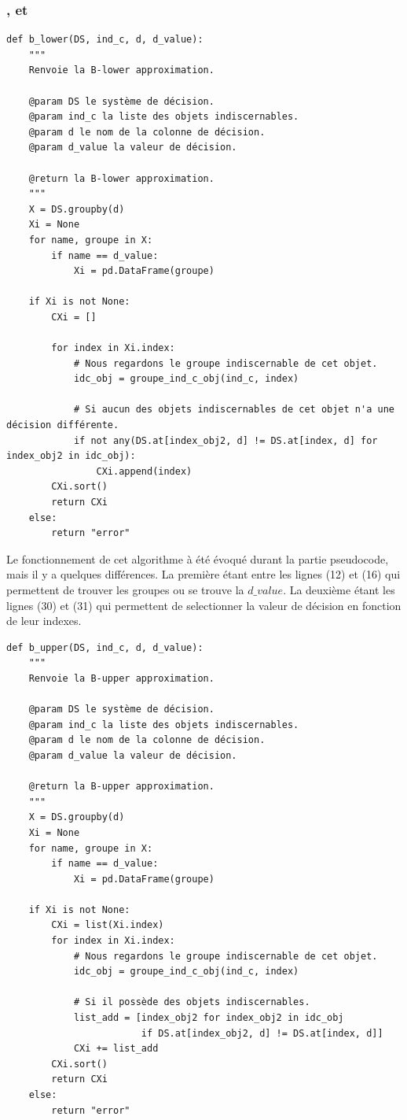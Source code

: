 \subsubsection{\blower, \bupper et \bboundary}
\begin{lstlisting}
def b_lower(DS, ind_c, d, d_value):
    """
    Renvoie la B-lower approximation.

    @param DS le système de décision.
    @param ind_c la liste des objets indiscernables.
    @param d le nom de la colonne de décision.
    @param d_value la valeur de décision.

    @return la B-lower approximation.
    """
    X = DS.groupby(d)
    Xi = None
    for name, groupe in X:
        if name == d_value:
            Xi = pd.DataFrame(groupe)

    if Xi is not None:
        CXi = []

        for index in Xi.index:
            # Nous regardons le groupe indiscernable de cet objet.
            idc_obj = groupe_ind_c_obj(ind_c, index)
            
            # Si aucun des objets indiscernables de cet objet n'a une décision différente.
            if not any(DS.at[index_obj2, d] != DS.at[index, d] for index_obj2 in idc_obj):
                CXi.append(index)
        CXi.sort()
        return CXi
    else:
        return "error"
\end{lstlisting}
Le fonctionnement de cet algorithme à été évoqué durant la partie
pseudocode, mais il y a quelques différences. La première étant entre
les lignes (12) et (16) qui permettent de trouver les groupes ou se trouve
la $d\_value$. La deuxième étant les lignes (30) et (31) qui permettent
de selectionner la valeur de décision en fonction de leur indexes.
\newpage
\begin{lstlisting}
def b_upper(DS, ind_c, d, d_value):
    """
    Renvoie la B-upper approximation.

    @param DS le système de décision.
    @param ind_c la liste des objets indiscernables.
    @param d le nom de la colonne de décision.
    @param d_value la valeur de décision.

    @return la B-upper approximation.
    """
    X = DS.groupby(d)
    Xi = None
    for name, groupe in X:
        if name == d_value:
            Xi = pd.DataFrame(groupe)

    if Xi is not None:
        CXi = list(Xi.index)
        for index in Xi.index:
            # Nous regardons le groupe indiscernable de cet objet.
            idc_obj = groupe_ind_c_obj(ind_c, index)
            
            # Si il possède des objets indiscernables.
            list_add = [index_obj2 for index_obj2 in idc_obj
                        if DS.at[index_obj2, d] != DS.at[index, d]]
            CXi += list_add
        CXi.sort()
        return CXi
    else:
        return "error"
\end{lstlisting}
